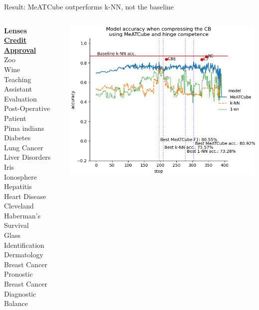 \documentclass[]{beamer}
\begin{document}
\begin{frame}{Result: MeATCube outperforms k-NN, not the baseline}
    \begin{columns}
        \begin{column}{.35\textwidth}
            {\smaller\smaller
            \textbf{Lenses} \\
            \underline{\textbf{Credit Approval}} \\
            Zoo \\
            Wine \\
            Teaching Assistant Evaluation \\
            Post-Operative Patient \\
            Pima indians Diabetes \\
            Lung Cancer \\
            Liver Disorders \\
            Iris \\
            Ionosphere \\
            Hepatitis \\
            Heart Disease Cleveland \\
            Haberman's Survival \\
            Glass Identification \\
            Dermatology \\
            Breast Cancer Pronostic \\
            Breast Cancer Diagnostic \\
            Balance\\
            ~}
        \end{column}
        \begin{column}{.65\textwidth}
            \includegraphics[width=.8\textwidth]{../results/figs/credit+approval}

\end{column}
\end{columns}
\end{frame}
\end{document}
